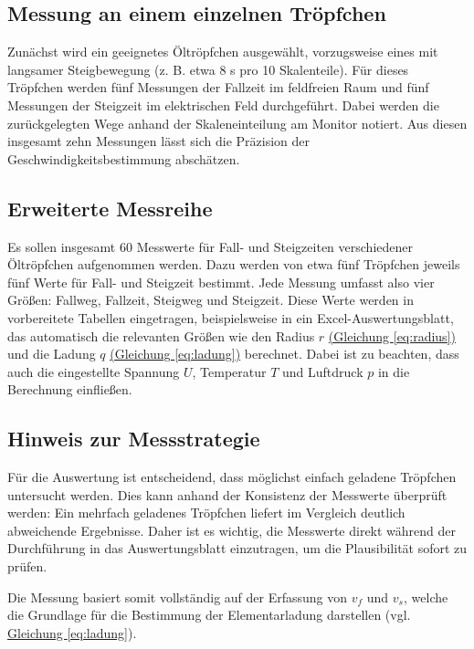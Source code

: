 \subsection*{Messung an einem einzelnen Tröpfchen}
Zunächst wird ein geeignetes Öltröpfchen ausgewählt, vorzugsweise eines mit langsamer Steigbewegung (z. B. etwa 8 s pro 10 Skalenteile). Für dieses Tröpfchen werden fünf Messungen der Fallzeit im feldfreien Raum und fünf Messungen der Steigzeit im elektrischen Feld durchgeführt. Dabei werden die zurückgelegten Wege anhand der Skaleneinteilung am Monitor notiert. Aus diesen insgesamt zehn Messungen lässt sich die Präzision der Geschwindigkeitsbestimmung abschätzen. 

\subsection*{Erweiterte Messreihe}
Es sollen insgesamt 60 Messwerte für Fall- und Steigzeiten verschiedener Öltröpfchen aufgenommen werden. Dazu werden von etwa fünf Tröpfchen jeweils fünf Werte für Fall- und Steigzeit bestimmt. Jede Messung umfasst also vier Größen: Fallweg, Fallzeit, Steigweg und Steigzeit. Diese Werte werden in vorbereitete Tabellen eingetragen, beispielsweise in ein Excel-Auswertungsblatt, das automatisch die relevanten Größen wie den Radius $r$ \hyperref[eq:radius]{(Gleichung \ref*{eq:radius})} und die Ladung $q$ \hyperref[eq:ladung]{(Gleichung \ref*{eq:ladung})} berechnet. Dabei ist zu beachten, dass auch die eingestellte Spannung $U$, Temperatur $T$ und Luftdruck $p$ in die Berechnung einfließen.

\subsection*{Hinweis zur Messstrategie}
Für die Auswertung ist entscheidend, dass möglichst einfach geladene Tröpfchen untersucht werden. Dies kann anhand der Konsistenz der Messwerte überprüft werden: Ein mehrfach geladenes Tröpfchen liefert im Vergleich deutlich abweichende Ergebnisse. Daher ist es wichtig, die Messwerte direkt während der Durchführung in das Auswertungsblatt einzutragen, um die Plausibilität sofort zu prüfen. 

Die Messung basiert somit vollständig auf der Erfassung von $v_f$ und $v_s$, welche die Grundlage für die Bestimmung der Elementarladung darstellen (vgl. \hyperref[eq:ladung]{Gleichung \ref*{eq:ladung}}).
